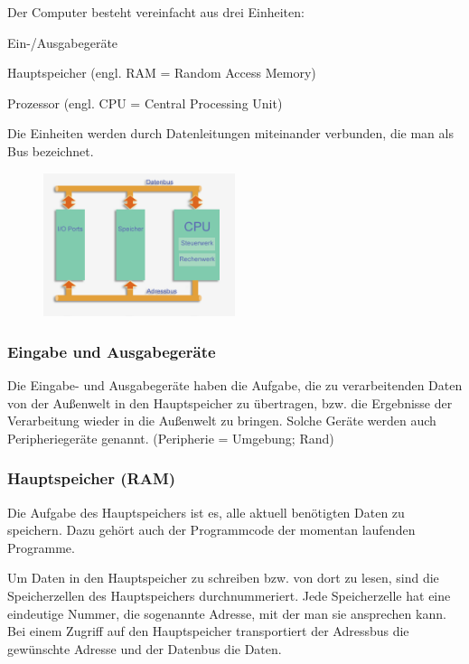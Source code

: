 Der Computer besteht vereinfacht aus drei Einheiten:

\begin{compactitem}
\item Ein-/Ausgabegeräte
\item Hauptspeicher (engl. RAM = Random Access Memory)
\item Prozessor (engl. CPU = Central Processing Unit)
\end{compactitem}

Die Einheiten werden durch Datenleitungen miteinander verbunden, die man als Bus bezeichnet.

\begin{figure}[h]
  \centering
   \includegraphics[width=0.5\textwidth]{./inf/SEKII/02_Hardware_und_Software/Bus.png}
\end{figure}

\subsubsection{Eingabe und Ausgabegeräte}

Die Eingabe- und Ausgabegeräte haben die Aufgabe, die zu verarbeitenden Daten
von der Außenwelt in den Hauptspeicher zu übertragen, bzw. die Ergebnisse der
Verarbeitung wieder in die Außenwelt zu bringen. Solche Geräte werden auch
Peripheriegeräte genannt. (Peripherie = Umgebung; Rand)

\subsubsection{Hauptspeicher (RAM)}

Die Aufgabe des Hauptspeichers ist es, alle aktuell benötigten
Daten zu speichern. Dazu gehört auch der Programmcode der
momentan laufenden Programme.

Um Daten in den Hauptspeicher zu schreiben bzw. von dort zu
lesen, sind die Speicherzellen des Hauptspeichers
durchnummeriert. Jede Speicherzelle hat eine eindeutige
Nummer, die sogenannte Adresse, mit der man sie ansprechen
kann. Bei einem Zugriff auf den Hauptspeicher transportiert der
Adressbus die gewünschte Adresse und der Datenbus die Daten.

